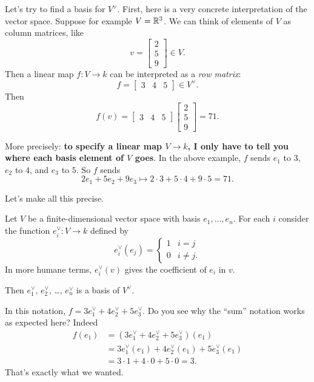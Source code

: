 Let's try to find a basis for $V^\vee$.
First, here is a very concrete interpretation of the vector space.
Suppose for example $V = \mathbb R^3$.
We can think of elements of $V$ as column matrices, like
\[ v = \begin{bmatrix}
		2 \\ 5 \\ 9
	\end{bmatrix}
	\in V. \]
Then a linear map $f \colon V \to k$ can be interpreted as a \emph{row matrix}:
\[
	f = \begin{bmatrix}
		3 & 4 & 5
	\end{bmatrix}
	\in V^\vee. \]
Then
\[
	f(v) = \begin{bmatrix}
		3 & 4 & 5
	\end{bmatrix}
	\begin{bmatrix}
		2 \\ 5 \\ 9
	\end{bmatrix}
	= 71. \]

More precisely: \textbf{to specify a linear map $V \to k$,
I only have to tell you where each basis element of $V$ goes}.
In the above example, $f$ sends $e_1$ to $3$, $e_2$ to $4$, and $e_3$ to $5$.
So $f$ sends \[ 2e_1 + 5e_2 + 9e_3 \mapsto 2 \cdot 3 + 5 \cdot 4 + 9 \cdot 5 = 71. \]

Let's make all this precise.
\begin{proposition}
	Let $V$ be a finite-dimensional vector space with basis $e_1, \dots, e_n$.
	For each $i$ consider the function $e_i^\vee \colon V \to k$
	defined by
	\[
		e_i^\vee(e_j)
		= \begin{cases}
			1 & i=j \\
			0 & i \neq j.
		\end{cases}
	\]
	In more humane terms, $e_i^\vee(v)$
	gives the coefficient of $e_i$ in $v$.

	Then $e_1^\vee$, $e_2^\vee$, \dots, $e_n^\vee$ is a basis of $V^\vee$.
\end{proposition}

\begin{example}
	In this notation, $f = 3e_1^\vee + 4e_2^\vee + 5e_3^\vee$.
	Do you see why the ``sum'' notation works as expected here?
	Indeed
	\begin{align*}
		f(e_1) &= (3e_1^\vee + 4e_2^\vee + 5e_3^\vee)(e_1) \\
		&= 3e_1^\vee(e_1) + 4e_2^\vee(e_1) + 5e_3^\vee(e_1) \\
		&= 3 \cdot 1 + 4 \cdot 0 + 5 \cdot 0 = 3.
	\end{align*}
	That's exactly what we wanted.
\end{example}

